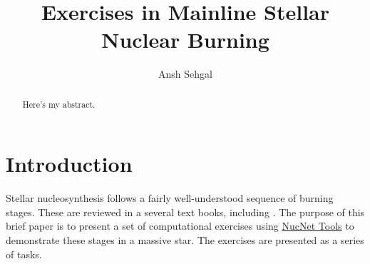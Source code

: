 \documentclass[manuscript]{aastex62}
\begin{document}
\title{Exercises in Mainline Stellar Nuclear Burning}


\author{Ansh Sehgal}

\begin{abstract}
Here's my abstract.
\end{abstract}

\section{Introduction}

Stellar nucleosynthesis follows a fairly well-understood sequence of burning
stages.  These are reviewed in a several text books, including
\cite{1983psen.book.....C,1996snai.book.....A,2007nps..book.....I}.
The purpose of this brief paper is to present a set of computational
exercises using
\href{http://sourceforge.net/projects/nucnet-tools/}{NucNet Tools}
to demonstrate these stages in a massive star.
The exercises are presented as a series of tasks.

%
\end{document}
